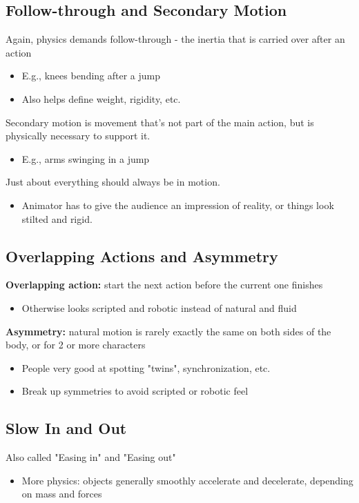 \documentclass{article}
\begin{document}
\subsection*{Follow-through and Secondary Motion}
Again, physics demands follow-through - the inertia that is carried over after an action
\begin{itemize}
    \item E.g., knees bending after a jump
    \item Also helps define weight, rigidity, etc.
\end{itemize}
Secondary motion is movement that's not part of the main action, but is physically necessary to support it.
\begin{itemize}
    \item E.g., arms swinging in a jump
\end{itemize}
Just about everything should always be in motion.
\begin{itemize}
    \item Animator has to give the audience an impression of reality, or things look stilted and rigid.
\end{itemize}

\subsection*{Overlapping Actions and Asymmetry}
\textbf{Overlapping action:} start the next action before the current one finishes
\begin{itemize}
    \item Otherwise looks scripted and robotic instead of natural and fluid
\end{itemize}
\textbf{Asymmetry:} natural motion is rarely exactly the same on both sides of the body, or for 2 or more characters
\begin{itemize}
    \item People very good at spotting "twins", synchronization, etc.
    \item Break up symmetries to avoid scripted or robotic feel
\end{itemize}

\subsection*{Slow In and Out}
Also called "Easing in" and "Easing out"
\begin{itemize}
    \item More physics: objects generally smoothly accelerate and decelerate, depending on mass and forces
\end{itemize}
\end{document}
